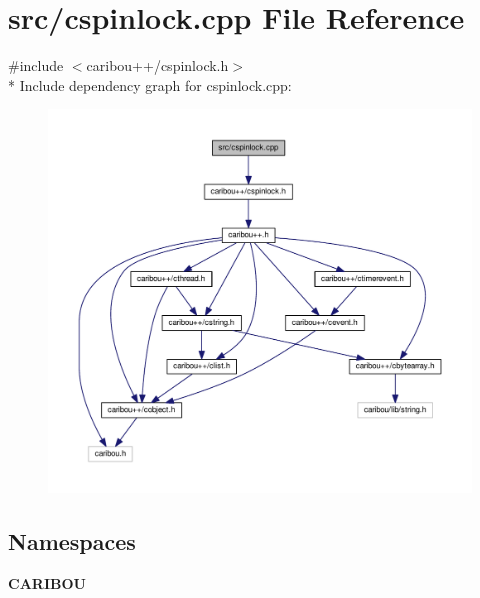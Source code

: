 \section{src/cspinlock.cpp File Reference}
\label{cspinlock_8cpp}
{\ttfamily \#include $<$caribou++/cspinlock.\-h$>$}\\*
Include dependency graph for cspinlock.\-cpp\-:\nopagebreak
\begin{figure}[H]
\begin{center}
\leavevmode
\includegraphics[width=350pt]{cspinlock_8cpp__incl}
\end{center}
\end{figure}
\subsection*{Namespaces}
\begin{DoxyCompactItemize}
\item 
{\bf C\-A\-R\-I\-B\-O\-U}
\end{DoxyCompactItemize}
